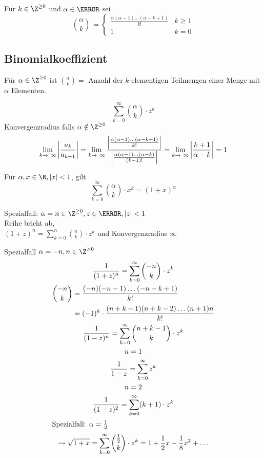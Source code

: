 \begin{bsp*}
	Für $k \in \Z^{\geq 0}$ und $\alpha \in \C$ sei 
	\[
		\binom{\alpha}{k} \coloneqq \begin{cases}
			\frac{\alpha ( \alpha - 1 ) \dots ( \alpha - k + 1 )}{k!}	&k \geq 1	\\
			1										&k = 0	
		\end{cases}
	\]
\end{bsp*}

\subsection{Binomialkoeffizient}
Für $\alpha \in \Z^{\geq 0}$ ist $\binom{\alpha}{k} =$ Anzahl der $k$-elementigen Teilmengen einer Menge mit $\alpha$ Elementen. \\
\begin{def*}[note = Binomische Reihe , index = Binomische Reihe]
	\[ \sum_{k=0}^\infty \binom{\alpha}{k} \cdot z^k \]
	Konvergenzradius falls $\alpha \notin \Z^{\geq 0}$
	\[ \lim_{k \rightarrow \infty} \abs{\frac{a_k}{a_{k+1}}} = \lim_{k \rightarrow \infty} \frac{\abs{\frac{\alpha (\alpha - 1) \dots (\alpha - k + 1)}{k!}}}{\abs{\frac{\alpha (\alpha - 1) \dots (\alpha - k)}{(k - 1)!}}} = \lim_{k \rightarrow \infty} \abs{\frac{k+1}{\alpha - k}} = 1
	\]
\end{def*}
\begin{satz*}
	Für $\alpha , x \in \R , \abs{x} < 1$, gilt
	\[ \sum_{k=0}^\infty \binom{\alpha}{k} \cdot x^k = (1 + x)^\alpha \]
\end{satz*}

Spezialfall: $\alpha = n \in \Z^{\geq 0} , z \in \C , \abs{z} < 1$ \\
Reihe bricht ab, \\
$(1 + z)^n = \sum_{k=0}^n \binom{n}{k} \cdot z^k$ und Konvergenzradius $\infty$

Spezialfall $\alpha = -n , n \in \Z^{> 0}$
\begin{gather*}
	\frac{1}{(1+z)^n} = \sum_{k=0}^\infty \binom{-n}{k} \cdot z^k \\
	\begin{split}
		\binom{-n}{k}	&= \frac{(-n)(-n-1) \dots (-n-k+1)}{k!} \\
					&= (-1)^k \cdot \frac{(n+k-1)(n+k-2) \dots (n+1) n}{k!}
	\end{split} \\
	\frac{1}{(1-z)^n} = \sum_{k=0}^\infty \binom{n+k-1}{k} \cdot z^k \\
	n=1 \\
	\frac{1}{1-z} = \sum_{k=0}^\infty z^k \\
	n=2 \\
	\frac{1}{(1-z)^2} = \sum_{k=0}^\infty (k+1) \cdot z^k \\
	\intertext{Spezialfall: $\alpha = \frac{1}{2}$}
	\rightsquigarrow \sqrt{1+x} = \sum_{k=0}^\infty \binom{\frac{1}{2}}{k} \cdot z^k = 1 + \frac{1}{2} x - \frac{1}{8} x^2 + \dots
\end{gather*}

